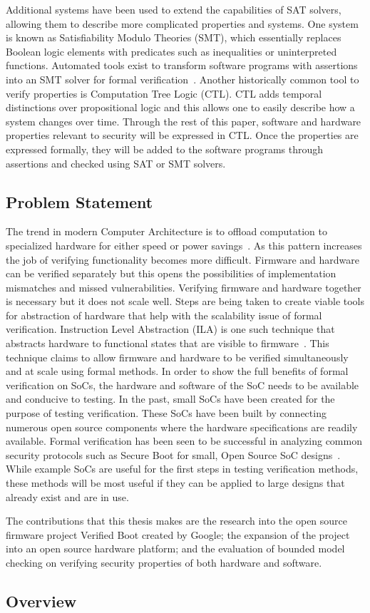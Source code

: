 \documentclass[../report.tex]{subfiles}
\begin{document}
Additional systems have been used to extend the capabilities of SAT solvers, allowing them to describe more complicated properties and systems. 
One system is known as Satisfiability Modulo Theories (SMT), which essentially replaces Boolean logic elements with predicates such as inequalities or uninterpreted functions. 
Automated tools exist to transform software programs with assertions into an SMT solver for formal verification~\cite{z3-smt-solver}.
Another historically common tool to verify properties is Computation Tree Logic (CTL).
CTL adds temporal distinctions over propositional logic and this allows one to easily describe how a system changes over time.
Through the rest of this paper, software and hardware properties relevant to security will be expressed in CTL\@. 
Once the properties are expressed formally, they will be added to the software programs through assertions and checked using SAT or SMT solvers.

\subsection{Problem Statement}

The trend in modern Computer Architecture is to offload computation to specialized hardware for either speed or power savings~\cite{hardware-accel}.
As this pattern increases the job of verifying functionality  becomes more difficult.
Firmware and hardware can be verified separately but this opens the possibilities of implementation mismatches and missed vulnerabilities.
Verifying firmware and hardware together is necessary but it does not scale well. 
Steps are being taken to create viable tools for abstraction of hardware that help with the scalability issue of formal verification.
Instruction Level Abstraction (ILA) is one such technique that abstracts hardware to functional states that are visible to firmware~\cite{ila}.
This technique claims to allow firmware and hardware to be verified simultaneously and at scale using formal methods.
In order to show the full benefits of formal verification on SoCs, the hardware and software of the SoC needs to be available and conducive to testing.
In the past, small SoCs have been created for the purpose of testing verification.
These SoCs have been built by connecting numerous open source components where the hardware specifications are readily available.
Formal verification has been seen to be successful in analyzing common security protocols such as Secure Boot for small, Open Source SoC designs~\cite{elane}. 
While example SoCs are useful for the first steps in testing verification methods, these methods will be most useful if they can be applied to large designs that already exist and are in use.

The contributions that this thesis makes are the research into the open source firmware project Verified Boot created by Google; the expansion of the project into an open source hardware platform; and the evaluation of bounded model checking on verifying security properties of both hardware and software.

\subsection{Overview}

\pagebreak
\end{document}
